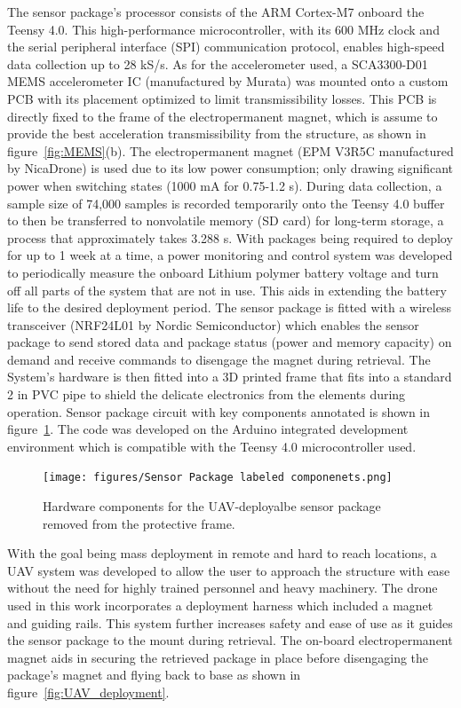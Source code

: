 \documentclass[]{spie}  %
\begin{document}
	The sensor package's processor consists of the ARM Cortex-M7 onboard the Teensy 4.0. This high-performance microcontroller, with its 600 MHz clock and the serial peripheral interface (SPI) communication protocol, enables high-speed data collection up to 28 kS/s. As for the accelerometer used, a SCA3300-D01 MEMS accelerometer IC (manufactured by Murata) was mounted onto a custom PCB with its placement optimized to limit transmissibility losses. This PCB is directly fixed to the frame of the electropermanent magnet, which is assume to provide the best acceleration transmissibility from the structure, as shown in figure~\ref{fig:MEMS}(b). The electropermanent magnet (EPM V3R5C manufactured by NicaDrone) is used due to its low power consumption; only drawing significant power when switching states (1000 mA for 0.75-1.2 s). During data collection, a sample size of 74,000 samples is recorded temporarily onto the Teensy 4.0 buffer to then be transferred to nonvolatile memory (SD card) for long-term storage, a process that approximately takes 3.288 s. With packages being required to deploy for up to 1 week at a time, a power monitoring and control system was developed to periodically measure the onboard Lithium polymer battery voltage and turn off all parts of the system that are not in use. This aids in extending the battery life to the desired deployment period. The sensor package is fitted with a wireless transceiver (NRF24L01 by Nordic Semiconductor) which enables the sensor package to send stored data and package status (power and memory capacity) on demand and receive commands to disengage the magnet during retrieval. The System's hardware is then fitted into a 3D printed frame that fits into a standard 2 in PVC pipe to shield the delicate electronics from the elements during operation. Sensor package circuit with key components annotated is shown in figure~\ref{fig:Sensor_Package_labeled_componenets}. The code was developed on the Arduino integrated development environment which is compatible with the Teensy 4.0 microcontroller used.  

	\begin{figure} [H]
	\centering
	\texttt{[image: figures/Sensor Package labeled componenets.png]}
	\caption{Hardware components for the UAV-deployalbe sensor package removed from the protective frame.}
	\label{fig:Sensor_Package_labeled_componenets}
	\end{figure}

	
	With the goal being mass deployment in remote and hard to reach locations, a UAV system was developed to allow the user to approach the structure with ease without the need for highly trained personnel and heavy machinery. The drone used in this work incorporates a deployment harness which included a magnet  and guiding rails. This system further increases safety and ease of use as it guides the sensor package to the mount during retrieval. The on-board electropermanent magnet aids in securing the retrieved package in place before disengaging the package’s magnet and flying back to base as shown in figure~\ref{fig:UAV_deployment}\cite{Carroll2021}.
\end{document}
